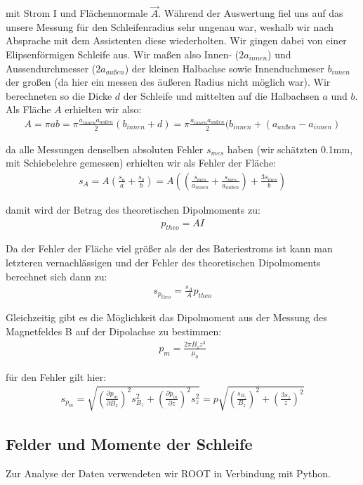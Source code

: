 \documentclass[12pt]{article}
\begin{document}
mit Strom I und Flächennormale $\vec{A}$. Während der Auswertung fiel uns auf das unsere Messung für den Schleifenradius sehr ungenau war, weshalb wir nach Absprache mit dem Assistenten diese wiederholten. Wir gingen dabei von einer Elipsenförmigen Schleife aus. Wir maßen also Innen- ($2a_{innen}$) und Aussendurchmesser ($2a_{außen}$) der kleinen Halbachse sowie Innenduchmeser $b_{innen}$ der großen (da hier ein messen des äußeren Radius nicht möglich war). Wir berechneten so die Dicke $d$ der Schleife und mittelten auf die Halbachsen $a$ und $b$. Als Fläche $A$ erhielten wir also:
\begin{align}
 A = \pi a b = \pi \frac{a_{innen} a_{außen}}{2} (b_{innen} + d) = \pi \frac{a_{innen} a_{außen}}{2} (b_{innen} + (a_{außen} - a_{innen})
\end{align}

da alle Messungen denselben absoluten Fehler $s_{mes}$ haben (wir schätzten 0.1mm, mit Schiebelehre gemessen) erhielten wir als Fehler der Fläche:
\begin{align}
 s_A = A \left( \frac{s_a}{a} + \frac{s_b}{b} \right) = A \left( \left( \frac{s_{mes}}{a_{innen}} + \frac{s_{mes}}{a_{außen}}\right) + \frac{3 s_{mes}}{b} \right)
\end{align}

damit wird der Betrag des theoretischen Dipolmoments zu:
\begin{align}
 p_{theo}=A I
\end{align}

Da der Fehler der Fläche viel größer als der des Bateriestroms ist kann man letzteren vernachlässigen und der Fehler des theoretischen Dipolmoments berechnet sich dann zu:
\begin{align}
 s_{p_{theo}}= \frac{s_A}{A} p_{theo}
\end{align}

Gleichzeitig gibt es die Möglichkeit das Dipolmoment aus der Messung des Magnetfeldes B auf der Dipolachse zu bestimmen:
\begin{align}
 p_m=\frac{2\pi B_z z^3}{\mu_0}
\end{align}

für den Fehler gilt hier:
\begin{align}
 s_{p_m}=\sqrt{\left( \frac{\partial p_m}{\partial B_z}\right) ^2 s_{B_z}^2+ \left( \frac{\partial p_m}{\partial z}\right) ^2 s_z^2} = p \sqrt{\left( \frac{s_{B_z}}{B_z}\right) ^2 + \left( \frac{3 s_z}{z}\right) ^2}
\end{align}

\subsection{Felder und Momente der Schleife}
Zur Analyse der Daten verwendeten wir ROOT in Verbindung mit Python.
\end{document}
